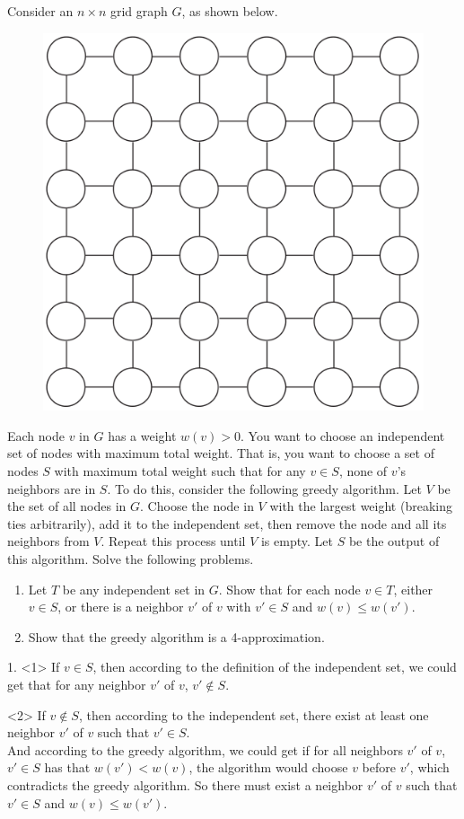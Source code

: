 \problem{}
Consider an $n \times n$ grid graph $G$, as shown below.

\begin{figure}[h]
    \centering
    \includegraphics[width=0.4\linewidth]{media/p4.png}
\end{figure}

Each node $v$ in $G$ has a weight $w(v) > 0$.  You want to choose an independent set of nodes with maximum total weight.  That is, you want to choose a set of nodes $S$ with maximum total weight such that for any $v \in S$, none of $v$'s neighbors are in $S$.  To do this, consider the following greedy algorithm.  Let $V$ be the set of all nodes in $G$.  Choose the node in $V$ with the largest weight (breaking ties arbitrarily), add it to the independent set, then remove the node and all its neighbors from $V$.  Repeat this process until $V$ is empty.  Let $S$ be the output of this algorithm.   Solve the following problems.

\begin{enumerate}
\item Let $T$ be any independent set in $G$.  Show that for each node $v \in T$, either $v \in S$, or there is a neighbor $v'$ of $v$ with $v' \in S$ and $w(v) \leq w(v')$.
\item Show that the greedy algorithm is a 4-approximation.
\end{enumerate}

\solution{}
1. <1> If $v \in S$, then according to the definition of the independent set, we could get that for any neighbor    $v'$ of $v$, $v' \notin S$.

<2> If $v \notin S$, then according to the independent set, there exist at least one neighbor $v'$ of $v$ such that $v' \in S$. \\
And according to the greedy algorithm, we could get if for all neighbors $v'$ of $v$, $v'\in S$ has that $w(v')<w(v)$, the algorithm would choose $v$ before $v'$, which contradicts the greedy algorithm. So there must exist a neighbor $v'$ of $v$ such that $v' \in S$ and $w(v) \leq w(v')$.

